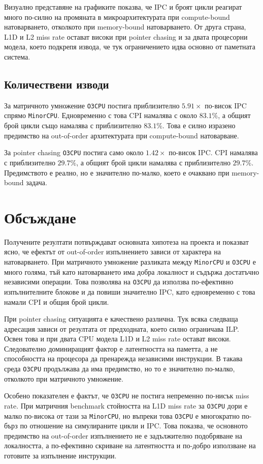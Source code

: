 \documentclass[12pt,a4paper]{article}
\begin{document}
Визуално представяне на графиките показва, че IPC и броят цикли реагират много по-силно на промяната в микроархитектурата при compute-bound натоварването, отколкото при memory-bound натоварването. От друга страна, L1D и L2 miss rate остават високи при pointer chasing и за двата процесорни модела, което подкрепя извода, че тук ограничението идва основно от паметната система.

\subsection{Количествени изводи}
За матричното умножение \texttt{O3CPU} постига приблизително \(5.91\times\) по-висок IPC спрямо \texttt{MinorCPU}. Едновременно с това CPI намалява с около \(83.1\%\), а общият брой цикли също намалява с приблизително \(83.1\%\). Това е силно изразено предимство на out-of-order архитектурата при compute-bound натоварване.

За pointer chasing \texttt{O3CPU} постига само около \(1.42\times\) по-висок IPC. CPI намалява с приблизително \(29.7\%\), а общият брой цикли намалява с приблизително \(29.7\%\). Предимството е реално, но е значително по-малко, което е очаквано при memory-bound задача.

\section{Обсъждане}
Получените резултати потвърждават основната хипотеза на проекта и показват ясно, че ефектът от out-of-order изпълнението зависи от характера на натоварването. При матричното умножение разликата между \texttt{MinorCPU} и \texttt{O3CPU} е много голяма, тъй като натоварването има добра локалност и съдържа достатъчно независими операции. Това позволява на \texttt{O3CPU} да използва по-ефективно изпълнителните блокове и да повиши значително IPC, като едновременно с това намали CPI и общия брой цикли.

При pointer chasing ситуацията е качествено различна. Тук всяка следваща адресация зависи от резултата от предходната, което силно ограничава ILP. Освен това и при двата CPU модела L1D и L2 miss rate остават високи. Следователно доминиращият фактор е латентността на паметта, а не способността на процесора да пренарежда независими инструкции. В такава среда \texttt{O3CPU} продължава да има предимство, но то е значително по-малко, отколкото при матричното умножение.

Особено показателен е фактът, че \texttt{O3CPU} не постига непременно по-нисък miss rate. При матричния benchmark стойността на L1D miss rate за \texttt{O3CPU} дори е малко по-висока от тази за \texttt{MinorCPU}, но въпреки това \texttt{O3CPU} е многократно по-бърз по отношение на симулираните цикли и IPC. Това показва, че основното предимство на out-of-order изпълнението не е задължително подобряване на локалността, а по-ефективно скриване на латентността и по-добро използване на готовите за изпълнение инструкции.
\end{document}
